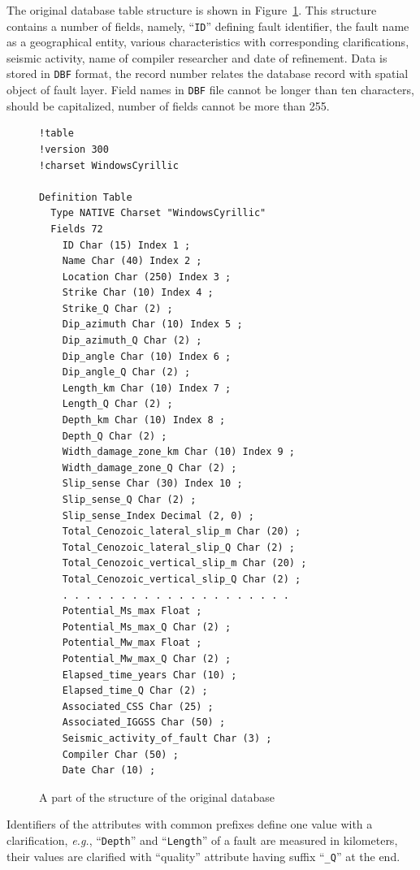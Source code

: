 \documentclass[
]{ceurart}
\begin{document}
The original database table structure is shown in Figure~\ref{fig:db-struct}.  This structure contains a number of fields, namely, ``\texttt{ID}'' defining fault identifier, the fault name as a geographical entity, various characteristics with corresponding clarifications, seismic activity, name of compiler researcher and date of refinement.  Data is stored in \texttt{DBF} format, the record number relates the database record with spatial object of fault layer.  Field names in \texttt{DBF} file cannot be longer than ten characters, should be capitalized, number of fields cannot be more than 255.
\begin{figure}
  \centering
  \footnotesize
    \begin{multicols}{2}
\begin{verbatim}
!table
!version 300
!charset WindowsCyrillic

Definition Table
  Type NATIVE Charset "WindowsCyrillic"
  Fields 72
    ID Char (15) Index 1 ;
    Name Char (40) Index 2 ;
    Location Char (250) Index 3 ;
    Strike Char (10) Index 4 ;
    Strike_Q Char (2) ;
    Dip_azimuth Char (10) Index 5 ;
    Dip_azimuth_Q Char (2) ;
    Dip_angle Char (10) Index 6 ;
    Dip_angle_Q Char (2) ;
    Length_km Char (10) Index 7 ;
    Length_Q Char (2) ;
    Depth_km Char (10) Index 8 ;
    Depth_Q Char (2) ;
    Width_damage_zone_km Char (10) Index 9 ;
    Width_damage_zone_Q Char (2) ;
    Slip_sense Char (30) Index 10 ;
    Slip_sense_Q Char (2) ;
    Slip_sense_Index Decimal (2, 0) ;
    Total_Cenozoic_lateral_slip_m Char (20) ;
    Total_Cenozoic_lateral_slip_Q Char (2) ;
    Total_Cenozoic_vertical_slip_m Char (20) ;
    Total_Cenozoic_vertical_slip_Q Char (2) ;
    . . . . . . . . . . . . . . . . . . . .
    Potential_Ms_max Float ;
    Potential_Ms_max_Q Char (2) ;
    Potential_Mw_max Float ;
    Potential_Mw_max_Q Char (2) ;
    Elapsed_time_years Char (10) ;
    Elapsed_time_Q Char (2) ;
    Associated_CSS Char (25) ;
    Associated_IGGSS Char (50) ;
    Seismic_activity_of_fault Char (3) ;
    Compiler Char (50) ;
    Date Char (10) ;
\end{verbatim}
  \end{multicols}
  \caption{A part of the structure of the original database}
  \label{fig:db-struct}
\end{figure}

  Identifiers of the attributes with common prefixes define one value with a clarification, \emph{e.g.}, ``\texttt{Depth}'' and ``\texttt{Length}'' of a fault are measured in kilometers, their values are clarified with ``quality'' attribute having suffix ``\texttt{\_Q}'' at the end.
\end{document}
